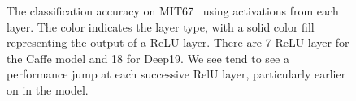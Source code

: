 \documentclass[10pt,twocolumn,letterpaper]{article}
\begin{document}
\begin{figure}[htbp]
\centering
\caption{The classification accuracy on MIT67~\cite{MIT67} using activations from each layer. The color indicates the layer type, with a solid color fill representing the output of a ReLU layer. There are 7 ReLU layer for the Caffe model and 18 for Deep19. We see tend to see a performance jump at each successive RelU layer, particularly earlier on in the model.}
\label{fig:layer_MIT67}
\end{figure}


%
\end{document}
